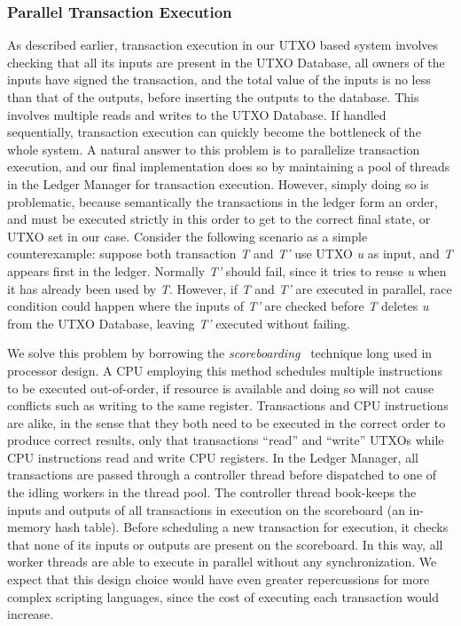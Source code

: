 \subsubsection{Parallel Transaction Execution}
\label{sec:scoreboarding}
As described earlier, transaction execution in our UTXO based system involves checking that all its inputs are present in the UTXO Database, all owners of the inputs have signed the transaction, and the total value of the inputs is no less than that of the outputs, before inserting the outputs to the database. This involves multiple reads and writes to the UTXO Database. If handled sequentially, transaction execution can quickly become the bottleneck of the whole system. A natural answer to this problem is to parallelize transaction execution, and our final implementation does so by maintaining a pool of threads in the Ledger Manager for transaction execution. However, simply doing so is problematic, because semantically the transactions in the ledger form an order, and must be executed strictly in this order to get to the correct final state, or UTXO set in our case. Consider the following scenario as a simple counterexample: suppose both transaction \textit{T} and \textit{T'} use UTXO \textit{u} as input, and \textit{T} appears first in the ledger. Normally \textit{T'} should fail, since it tries to reuse \textit{u} when it has already been used by \textit{T}. However, if \textit{T} and \textit{T'} are executed in parallel, race condition could happen where the inputs of \textit{T'} are checked before \textit{T} deletes \textit{u} from the UTXO Database, leaving \textit{T'} executed without failing.

We solve this problem by borrowing the \textit{scoreboarding}~\cite{scoreboarding} technique long used in processor design. A CPU employing this method schedules multiple instructions to be executed out-of-order, if resource is available and doing so will not cause conflicts such as writing to the same register. Transactions and CPU instructions are alike, in the sense that they both need to be executed in the correct order to produce correct results, only that transactions ``read'' and ``write'' UTXOs while CPU instructions read and write CPU registers. In the Ledger Manager, all transactions are passed through a controller thread before dispatched to one of the idling workers in the thread pool. The controller thread book-keeps the inputs and outputs of all transactions in execution on the scoreboard (an in-memory hash table). Before scheduling a new transaction for execution, it checks that none of its inputs or outputs are present on the scoreboard. In this way, all worker threads are able to execute in parallel without any synchronization. We expect that this design choice would have even greater repercussions for more complex scripting languages, since the cost of executing each transaction would increase.  

